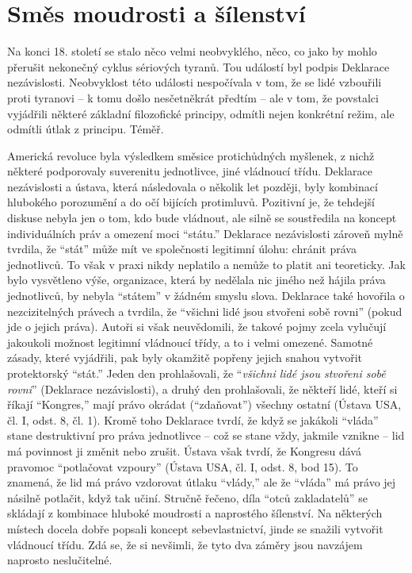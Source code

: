 \documentclass{book}
\begin{document}
\section{Směs moudrosti a šílenství}

Na konci 18. století se stalo něco velmi neobvyklého, něco, co jako by mohlo přerušit nekonečný cyklus sériových tyranů. Tou událostí byl podpis Deklarace nezávislosti. Neobvyklost této události nespočívala v tom, že se lidé vzbouřili proti tyranovi -- k tomu došlo nesčetněkrát předtím -- ale v tom, že povstalci vyjádřili některé základní filozofické principy, odmítli nejen konkrétní režim, ale odmítli útlak z principu. Téměř.

Americká revoluce byla výsledkem směsice protichůdných myšlenek, z nichž některé podporovaly suverenitu jednotlivce, jiné vládnoucí třídu. Deklarace nezávislosti a ústava, která následovala o několik let později, byly kombinací hlubokého porozumění a do očí bijících protimluvů. Pozitivní je, že tehdejší diskuse nebyla jen o tom, kdo bude vládnout, ale silně se soustředila na koncept individuálních práv a omezení moci \enquote{státu.} Deklarace nezávislosti zároveň mylně tvrdila, že \enquote{stát} může mít ve společnosti legitimní úlohu: chránit práva jednotlivců. To však v praxi nikdy neplatilo a nemůže to platit ani teoreticky. Jak bylo vysvětleno výše, organizace, která by nedělala nic jiného než hájila práva jednotlivců, by nebyla \enquote{státem} v žádném smyslu slova. Deklarace také hovořila o nezcizitelných právech a tvrdila, že \enquote{všichni lidé jsou stvořeni sobě rovni} (pokud jde o jejich práva). Autoři si však neuvědomili, že takové pojmy zcela vylučují jakoukoli možnost legitimní vládnoucí třídy, a to i velmi omezené. Samotné zásady, které vyjádřili, pak byly okamžitě popřeny jejich snahou vytvořit protektorský \enquote{stát.} Jeden den prohlašovali, že \enquote{\emph{všichni lidé jsou stvořeni sobě rovni}} (Deklarace nezávislosti), a druhý den prohlašovali, že někteří lidé, kteří si říkají \enquote{Kongres,} mají právo okrádat (\enquote{zdaňovat}) všechny ostatní (Ústava USA, čl. I, odst. 8, čl. 1). Kromě toho Deklarace tvrdí, že když se jakákoli \enquote{vláda} stane destruktivní pro práva jednotlivce -- což se stane vždy, jakmile vznikne -- lid má povinnost ji změnit nebo zrušit. Ústava však tvrdí, že Kongresu dává pravomoc \enquote{potlačovat vzpoury} (Ústava USA, čl. I, odst. 8, bod 15). To znamená, že lid má právo vzdorovat útlaku \enquote{vlády,} ale že \enquote{vláda} má právo jej násilně potlačit, když tak učiní. Stručně řečeno, díla \enquote{otců zakladatelů} se skládají z kombinace hluboké moudrosti a naprostého šílenství. Na některých místech docela dobře popsali koncept sebevlastnictví, jinde se snažili vytvořit vládnoucí třídu. Zdá se, že si nevšimli, že tyto dva záměry jsou navzájem naprosto neslučitelné.
\end{document}
